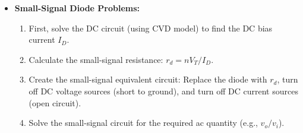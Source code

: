 \documentclass[12pt, letterpaper]{article}
\begin{document}
\begin{itemize}
    \item \textbf{Small-Signal Diode Problems:}
    \begin{enumerate}
        \item First, solve the DC circuit (using CVD model) to find the DC bias current $I_D$.
        \item Calculate the small-signal resistance: $r_d = nV_T / I_D$.
        \item Create the small-signal equivalent circuit: Replace the diode with $r_d$, turn off DC voltage sources (short to ground), and turn off DC current sources (open circuit).
        \item Solve the small-signal circuit for the required ac quantity (e.g., $v_o / v_i$).
    \end{enumerate}
\end{itemize}
\end{document}
